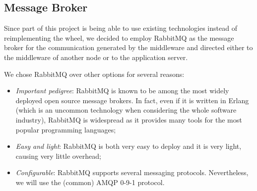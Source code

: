\subsection{Message Broker}
Since part of this project is being able to use existing technologies instead of
reimplementing the wheel, we decided to employ RabbitMQ as the message broker
for the communication generated by the middleware and directed either to
the middleware of another node or to the application server.

We chose RabbitMQ over other options for several reasons:
\begin{itemize}
  \item \textit{Important pedigree}: RabbitMQ is known to be among the
        most widely deployed open source message brokers. In fact, even if it
        is written in Erlang (which is an uncommon technology when considering
        the whole software industry), RabbitMQ is widespread as it provides many
        tools for the most popular programming languages;
  \item \textit{Easy and light}: RabbitMQ is both very easy to deploy and it is
        very light, causing very little overhead;
  \item \textit{Configurable}: RabbitMQ supports several messaging protocols.
        Nevertheless, we will use the (common) AMQP 0-9-1 protocol.
\end{itemize}
